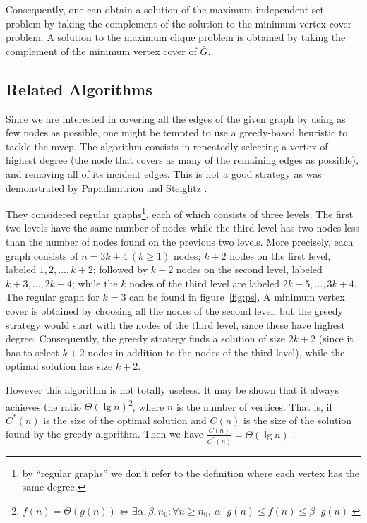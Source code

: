 \documentclass[12pt]{article}
\begin{document}
Consequently, one can obtain a solution of the maximum independent set
problem by taking the complement of the solution to the minimum vertex cover
problem. A solution to the maximum clique problem is obtained by
taking the complement of the minimum vertex cover of $\bar{G}$.

\subsection{Related Algorithms}
\label{sec:ra}
Since we are interested in covering all the edges of the
given graph by using as few nodes as possible, one might
be tempted to use a greedy-based heuristic to tackle the
mvcp.
The algorithm consists in repeatedly selecting a
vertex of highest degree (the node that covers as many
of the remaining edges as possible), and removing all
of its incident edges.
This is not a good strategy as was demonstrated
by Papadimitriou and Steiglitz \cite[p.~407]{10:mvcp}.

They considered regular graphs\footnote{%
by ``regular graphs'' we don't refer to the definition where
each vertex has the same degree.
}, each of which consists of three levels.
The first two levels have the same
number of nodes while the third level has two nodes less
than the number of nodes found on the previous two
levels.
More precisely, each graph consists of $n = 3k + 4 \ (k \geq 1)$
nodes; $k+2$ nodes on the first level, labeled $1, 2, \dots, k+2$;
followed by $k+2$ nodes on the second level, labeled $k+3, \dots, 2k+4$;
while the $k$ nodes of the third level are labeled $2k+5, \dots, 3k+4$.
The regular graph for $k = 3$ can be found in figure~\ref{fig:ps}.
A minimum vertex cover is obtained by choosing all
the nodes of the second level, but the greedy strategy
would start with the nodes of the third level, since these
have highest degree. Consequently, the greedy strategy
finds a solution of size $2k + 2$ (since it has to select $k + 2$
nodes in addition to the nodes of the third level), while
the optimal solution has size $k + 2$.

However this algorithm is not totally useless. It may be shown that it always
achieves the ratio $\Theta(\lg n)$\footnote{$f(n) = \Theta(g(n)) \iff
\exists \alpha, \beta, n_0 : \forall n \geq n_0, \ 
\alpha \cdot g(n) \leq f(n) \leq \beta \cdot g(n)$ \cite[pp.~41--43]{cormen}},
where $n$ is the number of vertices.
That is, if $C^*(n)$ is the size of the optimal
solution and $C(n)$ is the size of the solution found by the greedy
algorithm. Then we have $\frac{C(n)}{C^*(n)} = \Theta(\lg n)$ \cite[p.~323]{9:mvcp}.
\end{document}
